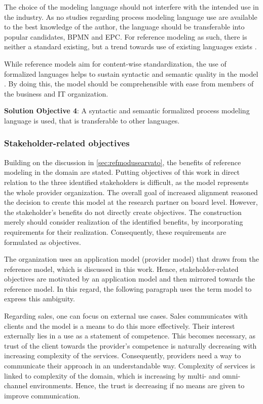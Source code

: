 The choice of the modeling language should not interfere with the intended use in the industry. As no studies regarding process modeling language use are available to the best knowledge of the author, the language should be transferable into popular candidates, \eg \acrshort{BPMN} and \acrshort{EPC}. For reference modeling as such, there is neither a standard existing, but a trend towards use of existing languages exists \citep{Fettke2004}. 

While reference models aim for content-wise standardization, the use of formalized languages helps to sustain syntactic and semantic quality in the model \citep{Fettke2004}. By doing this, the model should be comprehensible with ease from members of the business and IT organization. 

\hfill\begin{minipage}{\dimexpr\textwidth-1.2cm}
	\textbf{Solution Objective 4}: A syntactic and semantic formalized process modeling language is used, that is transferable to other languages. 
	
\end{minipage}

\subsubsection{Stakeholder-related objectives}

Building on the discussion in \ref{sec:refmodusearvato}, the benefits of reference modeling in the domain are stated. Putting objectives of this work in direct relation to the three identified stakeholders is difficult, as the model represents the whole provider organization. The overall goal of increased alignment reasoned the decision to create this model at the research partner on board level. However, the stakeholder's benefits do not directly create objectives. The construction merely should consider realization of the identified benefits, by incorporating requirements for their realization.  Consequently, these requirements are formulated as objectives.  

The organization uses an application model (provider model) that draws from the reference model, which is discussed in this work. Hence, stakeholder-related objectives are motivated by an application model and then mirrored towards the reference model. In this regard, the following paragraph uses the term model to express this ambiguity. 

Regarding sales, one can focus on external use cases. Sales communicates with clients and the model is a means to do this more effectively. Their interest externally lies in a use as a statement of competence. This becomes necessary, as trust of the client towards the provider's competence is naturally decreasing with increasing complexity of the services. Consequently, providers need a way to communicate their approach in an understandable way. Complexity of services is linked to complexity of the domain, which is increasing by multi- and omni-channel environments. Hence, the trust is decreasing if no means are given to improve communication. 


